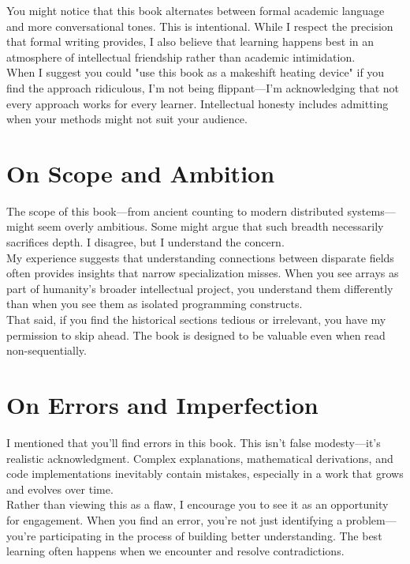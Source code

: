 You might notice that this book alternates between formal academic language and more conversational tones. This is intentional. While I respect the precision that formal writing provides, I also believe that learning happens best in an atmosphere of intellectual friendship rather than academic intimidation.\\

When I suggest you could "use this book as a makeshift heating device" if you find the approach ridiculous, I'm not being flippant—I'm acknowledging that not every approach works for every learner. Intellectual honesty includes admitting when your methods might not suit your audience.\\

\section*{On Scope and Ambition}

The scope of this book—from ancient counting to modern distributed systems—might seem overly ambitious. Some might argue that such breadth necessarily sacrifices depth. I disagree, but I understand the concern.\\

My experience suggests that understanding connections between disparate fields often provides insights that narrow specialization misses. When you see arrays as part of humanity's broader intellectual project, you understand them differently than when you see them as isolated programming constructs.\\

That said, if you find the historical sections tedious or irrelevant, you have my permission to skip ahead. The book is designed to be valuable even when read non-sequentially.\\

\section*{On Errors and Imperfection}

I mentioned that you'll find errors in this book. This isn't false modesty—it's realistic acknowledgment. Complex explanations, mathematical derivations, and code implementations inevitably contain mistakes, especially in a work that grows and evolves over time.\\

Rather than viewing this as a flaw, I encourage you to see it as an opportunity for engagement. When you find an error, you're not just identifying a problem—you're participating in the process of building better understanding. The best learning often happens when we encounter and resolve contradictions.\\

